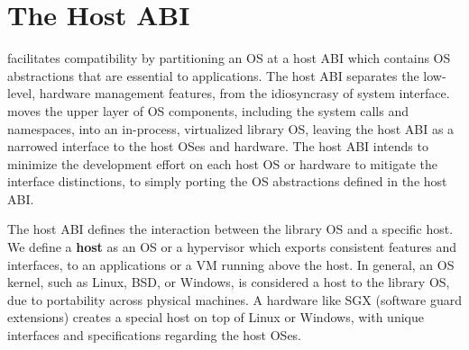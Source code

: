 \section{The Host ABI}
\label{sec:overview:host}


\graphene{} facilitates compatibility
by partitioning an OS
at a host ABI which contains
OS abstractions
that are essential to applications.
The host ABI separates the low-level, hardware management features, from the idiosyncrasy of system interface. 
\graphene{} moves the upper layer of OS components,
including the system calls and namespaces, into an in-process, virtualized library OS,
leaving the host ABI 
as a narrowed interface to the host OSes and hardware.
The host ABI intends to minimize the development effort on each host OS or hardware
to mitigate the interface distinctions,
to simply porting the OS abstractions defined in the host ABI.






 
The host ABI defines the interaction between the library OS and a specific host.
We define a {\bf host} as an OS or a hypervisor
which exports consistent features and interfaces, to an applications or a VM
running above the host.
In general, an OS kernel, such as Linux, BSD, or Windows, is considered a host to the library OS, due to portability across physical machines.
A hardware like SGX (software guard extensions)
creates a special host on top of Linux or Windows,
with unique interfaces and specifications regarding the host OSes.



